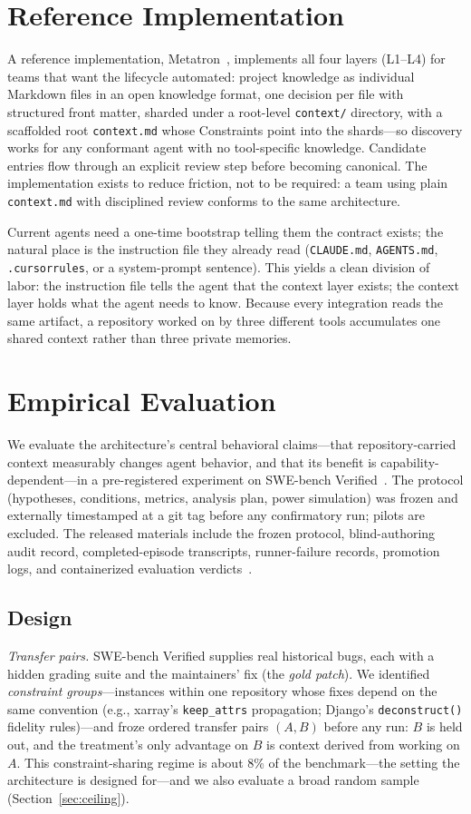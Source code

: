 \documentclass[sigconf,screen]{acmart}
\newcommand{\ctx}{\texttt{context.md}}
\begin{document}
\section{Reference Implementation}\label{sec:impl}
A reference implementation, Metatron~\cite{metatron}, implements all four layers
(L1--L4) for teams that want the lifecycle automated: project knowledge as
individual Markdown files in an open knowledge format, one decision per file with
structured front matter, sharded under a root-level \texttt{context/} directory,
with a scaffolded root \ctx{} whose Constraints point into the shards---so
discovery works for any conformant agent with no tool-specific knowledge. Candidate
entries flow through an explicit review step before becoming canonical. The
implementation exists to reduce friction, not to be required: a team using plain
\ctx{} with disciplined review conforms to the same architecture.

Current agents need a one-time bootstrap telling them the contract exists; the
natural place is the instruction file they already read (\texttt{CLAUDE.md},
\texttt{AGENTS.md}, \texttt{.cursorrules}, or a system-prompt sentence). This
yields a clean division of labor: the instruction file tells the agent that the
context layer exists; the context layer holds what the agent needs to know.
Because every integration reads the same artifact, a repository worked on by three
different tools accumulates one shared context rather than three private memories.

\section{Empirical Evaluation}\label{sec:eval}
We evaluate the architecture's central behavioral claims---that repository-carried
context measurably changes agent behavior, and that its benefit is
capability-dependent---in a pre-registered experiment on SWE-bench
Verified~\cite{swebench,swebenchverified}. The protocol (hypotheses, conditions, metrics, analysis
plan, power simulation) was frozen and externally timestamped at a git tag before
any confirmatory run; pilots are excluded. The released materials include the
frozen protocol, blind-authoring audit record, completed-episode transcripts,
runner-failure records, promotion logs, and containerized evaluation
verdicts~\cite{artifact}.

\subsection{Design}
\emph{Transfer pairs.} SWE-bench Verified supplies real historical bugs, each with
a hidden grading suite and the maintainers' fix (the \emph{gold patch}). We
identified \emph{constraint groups}---instances within one repository whose fixes
depend on the same convention (e.g., xarray's \texttt{keep\_attrs} propagation;
Django's \texttt{deconstruct()} fidelity rules)---and froze ordered transfer pairs
$(A,B)$ before any run: $B$ is held out, and the treatment's only advantage on $B$
is context derived from working on $A$. This constraint-sharing regime is about
8\% of the benchmark---the setting the architecture is designed for---and we also
evaluate a broad random sample (Section~\ref{sec:ceiling}).
\end{document}
